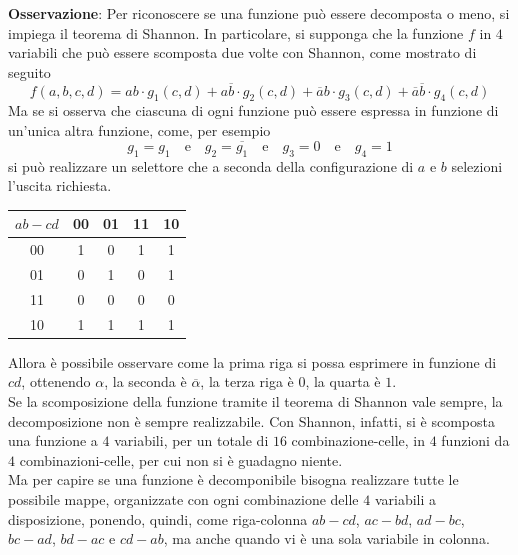 \documentclass[a4paper]{extarticle}
\renewcommand\arraystretch{}
\begin{document}
\vspace{1em}
\noindent
\textbf{Osservazione}: Per riconoscere se una funzione può essere decomposta o meno, si impiega il teorema di Shannon. In particolare, si supponga che la funzione $f$ in $4$ variabili che può essere scomposta due volte con Shannon, come mostrato di seguito
\[f(a,b,c,d)=ab \cdot g_1(c,d)+a\overline{b} \cdot g_2(c,d)+\overline{a}b \cdot g_3(c,d)+\overline{a}\overline{b} \cdot g_4(c,d)\]
Ma se si osserva che ciascuna di ogni funzione può essere espressa in funzione di un'unica altra funzione, come, per esempio
\[g_1=g_1\hspace{1em}\text{e}\hspace{1em}g_2=\overline{g_1}\hspace{1em}\text{e}\hspace{1em}g_3=0\hspace{1em}\text{e}\hspace{1em}g_4=1\]
si può realizzare un selettore che a seconda della configurazione di $a$ e $b$ selezioni l'uscita richiesta.

\vspace{1em}
\noindent
\begin{table}[H]
\setlength{\tabcolsep}{4pt}
\renewcommand{\arraystretch}{1.2}
\centering
\begin{tabular}{|c|c|c|c|c|}
    \hline
    $ab-cd$ & 00 & 01 & 11 & 10\\
    \hline
    00 & 1  & 0 & 1 & 1\\ 
    \hline
    01 & 0 & 1 & 0 & 1\\ 
    \hline
    11 & 0 & 0 & 0 & 0\\
    \hline
    10 & 1 & 1 & 1 & 1\\
    \hline
\end{tabular}
\end{table}

\vspace{1em}
\noindent
Allora è possibile osservare come la prima riga si possa esprimere in funzione di $cd$, ottenendo $\alpha$, la seconda è $\overline{\alpha}$, la terza riga è $0$, la quarta è $1$.\\
Se la scomposizione della funzione tramite il teorema di Shannon vale sempre, la decomposizione non è sempre realizzabile. Con Shannon, infatti, si è scomposta una funzione a $4$ variabili, per un totale di $16$ combinazione-celle, in $4$ funzioni da $4$ combinazioni-celle, per cui non si è guadagno niente.\\
Ma per capire se una funzione è decomponibile bisogna realizzare tutte le possibile mappe, organizzate con ogni combinazione delle $4$ variabili a disposizione, ponendo, quindi, come riga-colonna $ab-cd$, $ac-bd$, $ad-bc$, $bc-ad$, $bd-ac$ e $cd-ab$, ma anche quando vi è una sola variabile in colonna.
\end{document}

